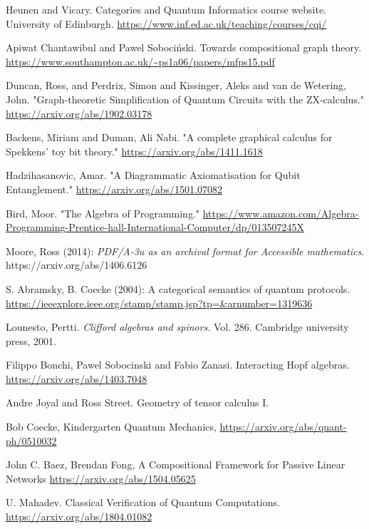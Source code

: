 \documentclass{amsart}
\begin{document}
\begin{thebibliography}{99}
 Heunen and Vicary. Categories and Quantum
  Informatics course website.  University of Edinburgh.
  \url{https://www.inf.ed.ac.uk/teaching/courses/cqi/}

 Apiwat Chantawibul and Pawel Soboci\'nski. Towards compositional graph theory. \url{https://www.southampton.ac.uk/~ps1a06/papers/mfps15.pdf}

 Duncan, Ross, and Perdrix, Simon and Kissinger, Aleks and van de Wetering, John. "Graph-theoretic Simplification of Quantum Circuits with the ZX-calculus."
  \url{https://arxiv.org/abs/1902.03178}

 Backens, Miriam and Duman, Ali Nabi. "A complete graphical calculus for Spekkens' toy bit theory."
  \url{https://arxiv.org/abs/1411.1618}


 Hadzihasanovic, Amar. "A Diagrammatic Axiomatisation for Qubit Entanglement."
  \url{https://arxiv.org/abs/1501.07082}

 Bird, Moor. "The Algebra of Programming."
  \url{https://www.amazon.com/Algebra-Programming-Prentice-hall-International-Computer/dp/013507245X}

 Moore, Ross (2014): \emph{PDF/A-3u as an archival format for Accessible mathematics}. https://arxiv.org/abs/1406.6126

 S. Abramsky, B. Coecke (2004): A categorical semantics of quantum protocols. \url{https://ieeexplore.ieee.org/stamp/stamp.jsp?tp=&arnumber=1319636}

 Lounesto, Pertti. \emph{Clifford algebras and spinors}. Vol. 286. Cambridge university press, 2001.

 Filippo Bonchi, Pawel Sobocinski and Fabio Zanasi. Interacting Hopf algebras. \url{https://arxiv.org/abs/1403.7048}

 Andre Joyal and Ross Street. Geometry of tensor calculus
  I.

 Bob Coecke, Kindergarten Quantum
  Mechanics, \url{https://arxiv.org/abs/quant-ph/0510032}

 John C. Baez, Brendan Fong, A
  Compositional Framework for Passive Linear Networks \url{https://arxiv.org/abs/1504.05625}

 U. Mahadev. Classical Verification of Quantum Computations. \url{https://arxiv.org/abs/1804.01082}


\end{thebibliography}
\end{document}
